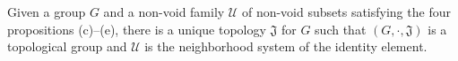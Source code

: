 Given a group $G$ and a non-void family $\mathcal{U}$ of non-void subsets satisfying the four propositions (c)--(e), there is a unique topology $\mathfrak{J}$ for $G$ such that $(G, \cdot, \mathfrak{J})$ is a topological group and $\mathcal{U}$ is the neighborhood system of the identity element.
